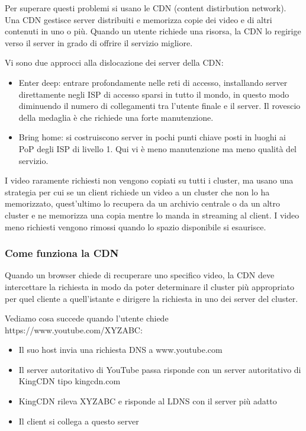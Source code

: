 \documentclass{book}
\begin{document}
Per superare questi problemi si usano le CDN (content distirbution network). Una CDN gestisce server distribuiti e memorizza copie dei video e di altri contenuti in uno o più. Quando un utente richiede una risorsa, la CDN lo regirige verso il server in grado di offrire il servizio migliore.

Vi sono due approcci alla dislocazione dei server della CDN:
\begin{itemize}
	\item Enter deep: entrare profondamente nelle reti di accesso, installando server direttamente negli ISP di accesso sparsi in tutto il mondo, in questo modo diminuendo il numero di collegamenti tra l'utente finale e il server. Il rovescio della medaglia è che richiede una forte manutenzione.
	\item Bring home: si costruiscono server in pochi punti chiave posti in luoghi ai PoP degli ISP di livello 1. Qui vi è meno manutenzione ma meno qualità del servizio.
\end{itemize}

I video raramente richiesti non vengono copiati su tutti i cluster, ma usano una strategia per cui se un client richiede un video a un cluster che non lo ha memorizzato, quest'ultimo lo recupera da un archivio centrale o da un altro cluster e ne memorizza una copia mentre lo manda in streaming al client. I video meno richiesti vengono rimossi quando lo spazio disponibile si esaurisce.

\subsubsection*{Come funziona la CDN}
Quando un browser chiede di recuperare uno specifico video, la CDN deve intercettare la richiesta in modo da poter determinare il cluster più appropriato per quel cliente a quell'istante e dirigere la richiesta in uno dei server del cluster.

Vediamo cosa succede quando l'utente chiede https://www.youtube.com/XYZABC:
\begin{itemize}
	\item Il suo host invia una richiesta DNS a www.youtube.com
	\item Il server autoritativo di YouTube passa risponde con un server autoritativo di KingCDN tipo kingcdn.com
	\item KingCDN rileva XYZABC e risponde al LDNS con il server più adatto
	\item Il client si collega a questo server
\end{itemize}
\end{document}
